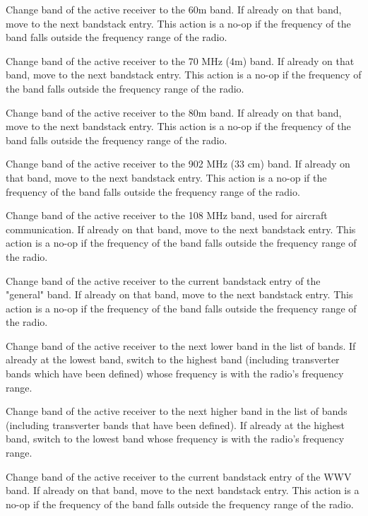 \documentclass[12pt]{book}
\begin{document}
{Change band of the active receiver to the 60m band. If already on that band, move to
the next bandstack entry. This action is a no-op if the frequency of the band falls outside the frequency
range of the radio.}

{Change band of the active receiver to the 70 MHz (4m)  band. If already on that band, move to
the next bandstack entry. This action is a no-op if the frequency of the band falls outside the frequency
range of the radio.}

{Change band of the active receiver to the 80m band. If already on that band, move to
the next bandstack entry. This action is a no-op if the frequency of the band falls outside the frequency
range of the radio.}

{Change band of the active receiver to the 902 MHz (33 cm) band. If already on that band, move to
the next bandstack entry. This action is a no-op if the frequency of the band falls outside the frequency
range of the radio.}

{Change band of the active receiver to the 108 MHz band, used for aircraft communication. If already on that
band, move to
the next bandstack entry. This action is a no-op if the frequency of the band falls outside the frequency
range of the radio.}

{Change band of the active receiver to the current bandstack entry of the "general" band. If already on that
band, move to
the next bandstack entry. This action is a no-op if the frequency of the band falls outside the frequency
range of the radio.}

{Change band of the active receiver to the next lower band in the list of bands. If already at the lowest
band, switch to the highest band (including transverter bands which have been defined) whose frequency is
with the radio's frequency range.}

{Change band of the active receiver to the next higher band in the list of bands (including transverter
bands that have been defined). If already at the highest band, switch to the lowest band whose frequency is
with the radio's frequency range.}

{Change band of the active receiver to the current bandstack entry of the WWV band. If already on that band,
move to the next bandstack entry. This action is a no-op if the frequency of the band falls outside the
frequency range of the radio.}
\end{document}
